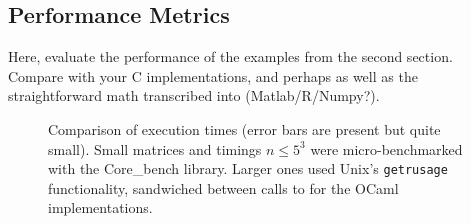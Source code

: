 \subsection{Performance Metrics}

Here, evaluate the performance of the examples from the second
section.  Compare with your C implementations, and perhaps as well as
the straightforward math transcribed into (Matlab/R/Numpy?).

\begin{figure}[t]
    \centering
    
    \caption{Comparison of execution times (error bars are present but quite
        small). Small matrices and timings $n \le 5^3$ were micro-benchmarked
        with the Core\_bench library. Larger ones used Unix's
        \texttt{getrusage} functionality, sandwiched between calls to
         for the OCaml implementations.}\label{fig:timings}
\end{figure}

